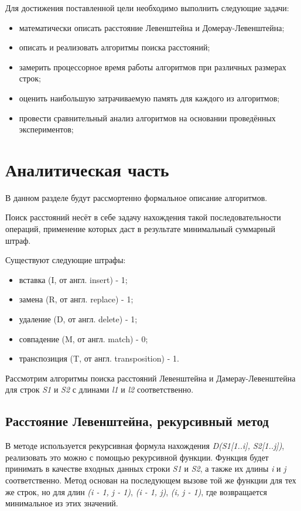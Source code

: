 \documentclass[12pt,a4paper]{report}
\begin{document}
Для достижения поставленной цели необходимо выполнить следующие 
задачи:
\begin{itemize}
	\item математически описать расстояние Левенштейна и Домерау-Левенштейна;
	\item описать и реализовать алгоритмы поиска расстояний;
	\item замерить процессорное время работы алгоритмов при различных размерах строк;
	\item оценить наибольшую затрачиваемую память для каждого из алгоритмов;
	\item провести сравнительный анализ алгоритмов на основании проведённых экспериментов; 
\end{itemize}



\newpage
\chapter{Аналитическая часть}

В данном разделе будут рассмортенно формальное описание алгоритмов.

Поиск расстояний несёт в себе задачу нахождения такой последовательности операций, применение которых 
даст в результате минимальный суммарный штраф.

Существуют следующие штрафы:
\begin{itemize}
	\item вставка (I, от англ. insert) - 1;
	\item замена (R, от англ. replace) - 1;
	\item удаление (D, от англ. delete) - 1;
	\item совпадение (M, от англ. match) - 0;
	\item транспозиция (T, от англ. transposition) - 1.
\end{itemize}

Рассмотрим алгоритмы поиска расстояний Левенштейна и Дамерау-Левенштейна для строк \textit{S1} и \textit{S2} с длинами 
\textit{l1} и \textit{l2} соответственно.

\section{Расстояние Левенштейна, рекурсивный метод}

В методе используется рекурсивная формула нахождения \textit{ D(S1[1..i], S2[1..j])}, реализовать это можно 
с помощью рекурсивной функции. Функция будет принимать в качестве входных данных строки \textit{S1} и \textit{S2}, а 
также их длины \textit{i} и \textit{j} соответственно. Метод основан на последующем вызове той же функции для тех же 
строк, но для длин \textit{(i - 1, j - 1)}, \textit{(i - 1, j)}, \textit{(i, j - 1)}, где возвращается минимальное из этих значений. 
\end{document}
